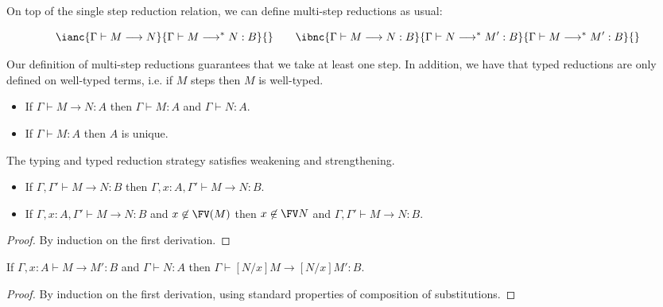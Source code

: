\documentclass{article}
\newcommand{\mred}{\longrightarrow^*}
\newcommand{\red}{\longrightarrow}
\begin{document}
On top of the single step reduction relation, we can define multi-step
reductions as usual:

\[
\ianc{\Gamma \vdash M \red N}{\Gamma \vdash M \mred N : B}{} \qquad
\ibnc{\Gamma \vdash M \red N : B}{\Gamma \vdash N \mred M' : B}
      {\Gamma \vdash M \mred M' : B}{}
\]

Our definition of multi-step reductions guarantees that we take at least one step.
In addition, we have that typed reductions are only defined on well-typed terms, i.e. if $M$ steps then $M$ is well-typed.

\begin{lemma}\quad
  \begin{itemize}
  \item If $\Gamma \vdash M \red N : A$ then $\Gamma \vdash M : A$ and $\Gamma \vdash N : A$.
  \item If $\Gamma \vdash M : A$ then $A$ is unique.
  \end{itemize}
\end{lemma}


The typing and typed reduction strategy satisfies weakening and
strengthening.

\begin{lemma}\label{lem:redprop}\quad
  \begin{itemize}
  \item If $\Gamma, \Gamma' \vdash M \red N : B$ then $\Gamma, x{:}A, \Gamma' \vdash M \red N : B$.
  \item If $\Gamma, x{:}A, \Gamma' \vdash M \red N : B$ and $x \not\in \FV(M)$ then
        $x \not\in \FV N$ and $\Gamma, \Gamma' \vdash M \red N : B$.
  \end{itemize}
\end{lemma}
\begin{proof}
By induction on the first derivation.
\end{proof}


\begin{lemma}\label{lem:redsubst}\quad
If $\Gamma, x{:}A \vdash M \red M' : B$ and $\Gamma \vdash N : A$ then
$\Gamma \vdash [N/x]M \red [N/x]M' : B$.
\end{lemma}
\begin{proof}
By induction on the first derivation, using standard properties of composition of substitutions.
\end{proof}
\end{document}
